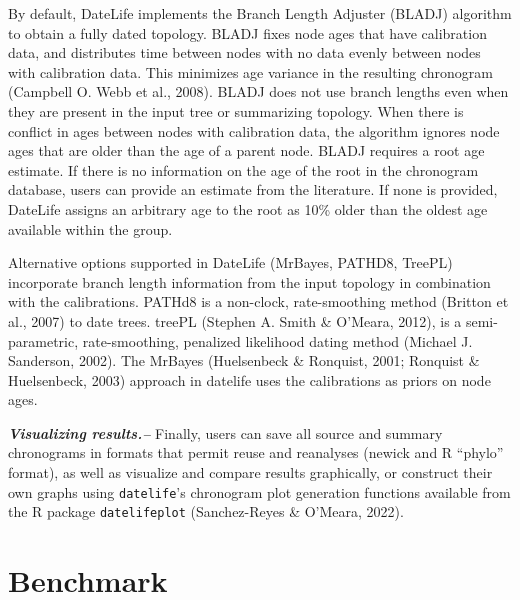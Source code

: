 \documentclass[
  english,
  man]{apa6}
\begin{document}
By default, DateLife implements the Branch Length Adjuster (BLADJ) algorithm to obtain a fully dated topology. BLADJ fixes node ages that have calibration data, and distributes time between nodes with no data evenly between nodes with calibration data.
This minimizes age variance in the resulting chronogram (Campbell O. Webb et al., 2008).
BLADJ does not use branch lengths even when they are present in the input tree or summarizing topology.
When there is conflict in ages between nodes with calibration data, the algorithm ignores node ages that are older than the age of a parent node.
BLADJ requires a root age estimate. If there is no information on the age of the root in the chronogram database, users can provide an estimate from the literature. If none is provided, DateLife assigns an arbitrary age to the root as 10\% older than the oldest age available within the group.

Alternative options supported in DateLife (MrBayes, PATHD8, TreePL) incorporate branch length information from the input topology in combination with the calibrations.
PATHd8 is a non-clock, rate-smoothing method (Britton et al., 2007) to date trees.
treePL (Stephen A. Smith \& O'Meara, 2012), is a semi-parametric, rate-smoothing, penalized likelihood dating method
(Michael J. Sanderson, 2002).
The MrBayes (Huelsenbeck \& Ronquist, 2001; Ronquist \& Huelsenbeck, 2003) approach in datelife uses the calibrations as priors on node ages.

\emph{\textbf{Visualizing results.--}}
Finally, users can save all source and summary chronograms in formats that permit reuse and reanalyses (newick and R ``phylo'' format), as well as visualize and compare results graphically, or construct their own graphs using \texttt{datelife}'s chronogram plot generation functions available from the R package \texttt{datelifeplot} (Sanchez-Reyes \& O'Meara, 2022).

\hypertarget{benchmark}{%
\section{Benchmark}\label{benchmark}}
\end{document}
